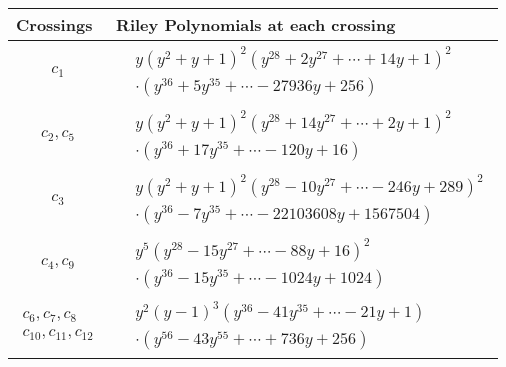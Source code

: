 \documentclass[1p]{elsarticle_modified}
\theoremstyle{definition}
\begin{document}
\begin{tabular}{m{50pt}|m{274pt}}
Crossings & \hspace{64pt}Riley Polynomials at each crossing \\
\hline $$\begin{aligned}c_{1}\end{aligned}$$&$\begin{aligned}
&y(y^2+y+1)^2(y^{28}+2 y^{27}+\cdots+14 y+1)^{2}\\
&\cdot(y^{36}+5 y^{35}+\cdots-27936 y+256)
\end{aligned}$\\
\hline $$\begin{aligned}c_{2},c_{5}\end{aligned}$$&$\begin{aligned}
&y(y^2+y+1)^2(y^{28}+14 y^{27}+\cdots+2 y+1)^{2}\\
&\cdot(y^{36}+17 y^{35}+\cdots-120 y+16)
\end{aligned}$\\
\hline $$\begin{aligned}c_{3}\end{aligned}$$&$\begin{aligned}
&y(y^2+y+1)^2(y^{28}-10 y^{27}+\cdots-246 y+289)^{2}\\
&\cdot(y^{36}-7 y^{35}+\cdots-22103608 y+1567504)
\end{aligned}$\\
\hline $$\begin{aligned}c_{4},c_{9}\end{aligned}$$&$\begin{aligned}
&y^5(y^{28}-15 y^{27}+\cdots-88 y+16)^{2}\\
&\cdot(y^{36}-15 y^{35}+\cdots-1024 y+1024)
\end{aligned}$\\
\hline $$\begin{aligned}c_{6},c_{7},c_{8}\\c_{10},c_{11},c_{12}\end{aligned}$$&$\begin{aligned}
&y^2(y-1)^3(y^{36}-41 y^{35}+\cdots-21 y+1)\\
&\cdot(y^{56}-43 y^{55}+\cdots+736 y+256)
\end{aligned}$\\
\hline
\end{tabular}
\vskip 2pc
\end{document}
